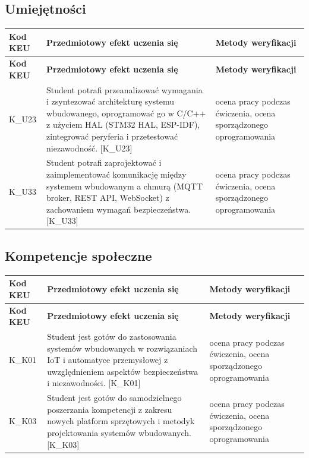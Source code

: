 \documentclass[12pt, a4paper]{article}
\newcommand{\thdrule}{\noalign{\global\setlength{\extrarowheight}{0pt}}}
\newcommand{\thdend}{\noalign{\global\setlength{\extrarowheight}{3pt}}}
\begin{document}
\subsection*{Umiejętności}
{\scriptsize
\begin{longtable}{m{1.6cm}m{9.0cm}m{4.2cm}}
\thdrule\toprule
\rowcolor{pjatkRed} {\color{white}\footnotesize\textbf{\vphantom{Ag}Kod KEU}} & {\color{white}\footnotesize\textbf{\vphantom{Ag}Przedmiotowy efekt uczenia się}} & {\color{white}\footnotesize\textbf{\vphantom{Ag}Metody weryfikacji}} \\
\midrule\thdend
\endfirsthead
\thdrule\toprule
\rowcolor{pjatkRed} {\color{white}\footnotesize\textbf{\vphantom{Ag}Kod KEU}} & {\color{white}\footnotesize\textbf{\vphantom{Ag}Przedmiotowy efekt uczenia się}} & {\color{white}\footnotesize\textbf{\vphantom{Ag}Metody weryfikacji}} \\
\midrule\thdend
\endhead
  \rowcolor{tableRowLight} K\_U23 & Student potrafi przeanalizować wymagania i zsyntezować architekturę systemu wbudowanego, oprogramować go w C/C++ z użyciem HAL (STM32 HAL, ESP-IDF), zintegrować peryferia i przetestować niezawodność. {[}K\_U23{]} & ocena pracy podczas ćwiczenia, ocena sporządzonego oprogramowania \\
  \rowcolor{tableRowAlt} K\_U33 & Student potrafi zaprojektować i zaimplementować komunikację między systemem wbudowanym a chmurą (MQTT broker, REST API, WebSocket) z zachowaniem wymagań bezpieczeństwa. {[}K\_U33{]} & ocena pracy podczas ćwiczenia, ocena sporządzonego oprogramowania \\
\bottomrule
\end{longtable}}

\subsection*{Kompetencje społeczne}
{\scriptsize
\begin{longtable}{m{1.6cm}m{9.0cm}m{4.2cm}}
\thdrule\toprule
\rowcolor{pjatkRed} {\color{white}\footnotesize\textbf{\vphantom{Ag}Kod KEU}} & {\color{white}\footnotesize\textbf{\vphantom{Ag}Przedmiotowy efekt uczenia się}} & {\color{white}\footnotesize\textbf{\vphantom{Ag}Metody weryfikacji}} \\
\midrule\thdend
\endfirsthead
\thdrule\toprule
\rowcolor{pjatkRed} {\color{white}\footnotesize\textbf{\vphantom{Ag}Kod KEU}} & {\color{white}\footnotesize\textbf{\vphantom{Ag}Przedmiotowy efekt uczenia się}} & {\color{white}\footnotesize\textbf{\vphantom{Ag}Metody weryfikacji}} \\
\midrule\thdend
\endhead
  \rowcolor{tableRowLight} K\_K01 & Student jest gotów do zastosowania systemów wbudowanych w rozwiązaniach IoT i automatyce przemysłowej z uwzględnieniem aspektów bezpieczeństwa i niezawodności. {[}K\_K01{]} & ocena pracy podczas ćwiczenia, ocena sporządzonego oprogramowania \\
  \rowcolor{tableRowAlt} K\_K03 & Student jest gotów do samodzielnego poszerzania kompetencji z zakresu nowych platform sprzętowych i metodyk projektowania systemów wbudowanych. {[}K\_K03{]} & ocena pracy podczas ćwiczenia, ocena sporządzonego oprogramowania \\
\bottomrule
\end{longtable}}
\end{document}
